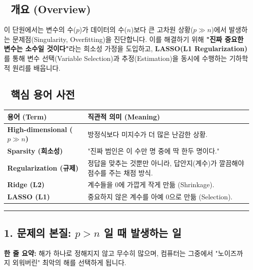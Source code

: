 \documentclass[11pt,a4paper]{book}
\theoremstyle{definition}
\begin{document}
\subsection*{📌 개요 (Overview)}
이 단원에서는 변수의 수($p$)가 데이터의 수($n$)보다 큰 고차원 상황($p \gg n$)에서 발생하는 문제점(Singularity, Overfitting)을 진단합니다. 이를 해결하기 위해 \textbf{"진짜 중요한 변수는 소수일 것이다"}라는 희소성 가정을 도입하고, \textbf{LASSO(L1 Regularization)}를 통해 변수 선택(Variable Selection)과 추정(Estimation)을 동시에 수행하는 기하학적 원리를 배웁니다.

\subsection*{📝 핵심 용어 사전}
\begin{table}[h]
\centering
\begin{tabularx}{\textwidth}{|p{}|X|}
\hline
\textbf{용어 (Term)} & \textbf{직관적 의미 (Meaning)} \\
\hline
\textbf{High-dimensional ($p \gg n$)} & 방정식보다 미지수가 더 많은 난감한 상황. \\
\hline
\textbf{Sparsity (희소성)} & "진짜 범인은 이 수만 명 중에 딱 한두 명이다." \\
\hline
\textbf{Regularization (규제)} & 정답을 맞추는 것뿐만 아니라, 답안지(계수)가 깔끔해야 점수를 주는 채점 방식. \\
\hline
\textbf{Ridge (L2)} & 계수들을 0에 가깝게 작게 만듦 (Shrinkage). \\
\hline
\textbf{LASSO (L1)} & 중요하지 않은 계수를 아예 0으로 만듦 (Selection). \\
\hline
\end{tabularx}
\end{table}

\vspace{0.5cm}\hrule\vspace{0.5cm}

\subsection{1. 문제의 본질: $p > n$ 일 때 발생하는 일}

\begin{conceptbox}[title={개념 1: 식보다 미지수가 많다}]
\textbf{한 줄 요약:} 해가 하나로 정해지지 않고 무수히 많으며, 컴퓨터는 그중에서 "노이즈까지 외워버린" 최악의 해를 선택하게 됩니다.
\end{conceptbox}
\end{document}
